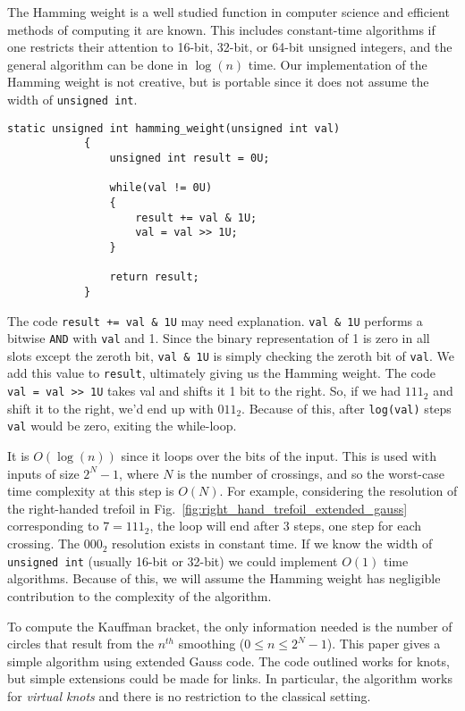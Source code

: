 \documentclass{article}
\theoremstyle{plain}
\begin{document}
        The Hamming weight is a well studied function in computer science and
        efficient methods of computing it are known. This includes
        constant-time algorithms if one restricts their attention to
        16-bit, 32-bit, or 64-bit unsigned integers, and the general algorithm
        can be done in $\log(n)$ time. Our implementation of the Hamming weight
        is not creative, but is portable since it does not assume the width of
        \texttt{unsigned int}.
        \begin{lstlisting}[style=CStyle, gobble=12]
            static unsigned int hamming_weight(unsigned int val)
            {
                unsigned int result = 0U;

                while(val != 0U)
                {
                    result += val & 1U;
                    val = val >> 1U;
                }

                return result;
            }
        \end{lstlisting}
        The code \texttt{result += val \& 1U} may need explanation.
        \texttt{val \& 1U} performs a bitwise \texttt{AND} with \texttt{val} and
        1. Since the binary representation of 1 is zero in all slots except the
        zeroth bit, \texttt{val \& 1U} is simply checking the zeroth bit of
        \texttt{val}. We add this value to \texttt{result}, ultimately giving
        us the Hamming weight. The code \texttt{val = val >> 1U} takes val and
        shifts it 1 bit to the right. So, if we had $111_{2}$ and shift it to
        the right, we'd end up with $011_{2}$. Because of this, after
        \texttt{log(val)} steps \texttt{val} would be zero, exiting the
        while-loop.
        \par\hfill\par
        It is $O(\log(n))$ since it loops over the bits of the input. This is
        used with inputs of size $2^{N}-1$, where $N$ is the number of
        crossings, and so the worst-case time complexity at this step is $O(N)$.
        For example, considering the resolution of the right-handed trefoil
        in Fig.~\ref{fig:right_hand_trefoil_extended_gauss} corresponding to
        $7=111_{2}$, the loop will end after 3 steps, one step for each
        crossing. The $000_{2}$ resolution exists in constant time. If we know
        the width of \texttt{unsigned int} (usually 16-bit or 32-bit) we could
        implement $O(1)$ time algorithms. Because of this, we will assume the
        Hamming weight has negligible contribution to the complexity of the
        algorithm.
        \par\hfill\par
        To compute the Kauffman bracket, the
        only information needed is the number of circles that result from the
        $n^{th}$ smoothing ($0\leq{n}\leq{2}^{N}-1$). This paper gives a simple
        algorithm using extended Gauss code. The code outlined works for knots,
        but simple extensions could be made for links. In particular, the
        algorithm works for \textit{virtual knots} and there is no restriction
        to the classical setting.
\end{document}
